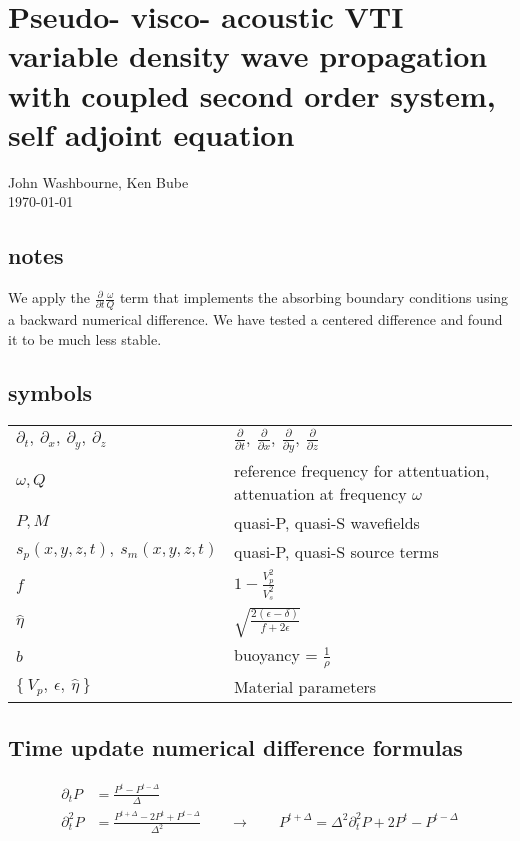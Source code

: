 \documentclass[10pt,fleqn]{article}
\begin{document}
\section{Pseudo- visco- acoustic VTI variable density wave propagation with coupled second order system, self adjoint equation}
John Washbourne, Ken Bube\\
\today

\subsection{notes}
We apply the $\displaystyle \frac{\partial}{\partial t} \frac{\omega}{Q} $ term that implements the absorbing boundary conditions 
using a backward numerical difference.  We have tested a centered difference and found it to be much less stable.

\subsection{symbols}

\begin{center}
\begin{tabular}{ll} \\[-10pt]
$\partial_t,\ \partial_x,\ \partial_y,\ \partial_z$ & $ 
\displaystyle \frac{\partial }{\partial t},\ 
\displaystyle \frac{\partial }{\partial x},\ 
\displaystyle \frac{\partial }{\partial y},\ 
\displaystyle \frac{\partial }{\partial z} $ \\[15pt]
$\omega, Q$ & reference frequency for attentuation, attenuation at frequency $\omega$ \\[10pt]
$P, M$ & quasi-P, quasi-S wavefields\\[10pt]
$s_p(x,y,z,t),\ s_m(x,y,z,t)$ & quasi-P, quasi-S source terms\\[10pt]
$f$ & $ 1 - \displaystyle \frac{V_p^2}{V_s^2} $\\[10pt]
$ \widehat{\eta} $ & $ \sqrt{ \displaystyle \frac{2 \left(\epsilon - \delta\right) }{f + 2 \epsilon } } $\\[10pt]
$b$ & buoyancy = $\displaystyle \frac{1}{\rho} $ \\[10pt]
$ \{\ V_p,\ \epsilon,\ \widehat{\eta}\ \} $ & Material parameters \\[10pt]
\end{tabular}
\end{center}

\subsection{Time update numerical difference formulas}
\label{sec:diff}
\begin{equation}
\begin{aligned}
\partial_t P  &= \frac{P^t - P^{t-\Delta} }{ \Delta}  \\[10pt]
\partial_t^2 P &= \frac{P^{t+\Delta} - 2 P^t + P^{t-\Delta} }{ \Delta^2 } \qquad \rightarrow \qquad
P^{t+\Delta} = \Delta^2 \partial_t^2 P + 2 P^t - P^{t-\Delta} 
\end{aligned}
\nonumber
\end{equation}
\end{document}

